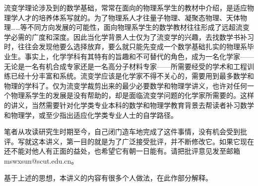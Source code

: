 \documentclass[main.tex]{subfiles}
\begin{document}
流变学理论涉及到的数学基础，常常在面向的物理系学生的教材中介绍，是适应物理学人才的培养体系写就的。为了物理系人才往量子物理、凝聚态物理、天体物理……等不同方向发展的可能性，面向物理系学生的数学教材往往形成了远超流变学必需的广度和深度。因此当化学背景人士仅为了流变学的兴趣，去找数学书补习时，往往会发现他要么选择放弃，要么就只能先变成一个数学基础扎实的物理系毕业生。事实上，化学学科有其特有的旨趣和不可替代的角色，成为一名化学家——无论是一名有机合成专家还是一名高分子材料专家——所需要经受的学术和工程训练已经十分丰富和系统。流变学应该是化学家不得不关心的，需要用到最多数学和物理的学科了。仅为流变学裁剪出来的最少必要数学和物理学讲义，也许对任何一个物理系学生的发展是没有帮助的，却是面临流变学问题的化学家所需要的。这样的讲义，当然需要针对化学类专业本科的数学和物理学教育背景去帮读者补习数学和物理学，或至少指出适应化学类专业人士的自学路径。

笔者从攻读研究生时期至今，自己闭门造车地完成了这件事情，没有机会受到批评。写就这本讲义，第一目的就是为了广泛接受批评，并不断修改它。如果它现在还不能对他人有正面的益处，也希望它有朝一日能有。请把批评意见发至邮箱mswxsun@scut.edu.cn。

基于上述的思想，本讲义的内容有很多个人做法，在此作部分解释。
\end{document}
